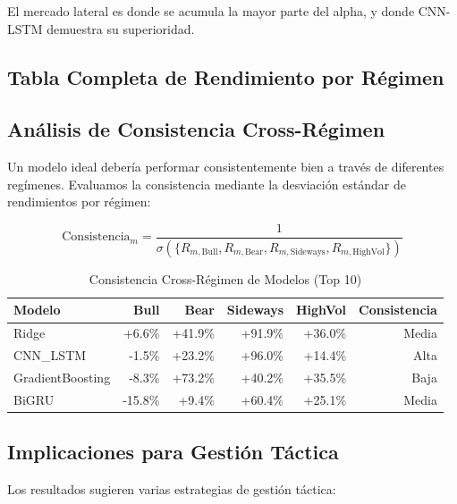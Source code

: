 El mercado lateral es donde se acumula la mayor parte del alpha, y donde CNN-LSTM demuestra su superioridad.

\subsection{Tabla Completa de Rendimiento por R\'egimen}
\label{subsec:regime_table}



\subsection{An\'alisis de Consistencia Cross-R\'egimen}
\label{subsec:cross_regime}

Un modelo ideal deber\'ia performar consistentemente bien a trav\'es de diferentes reg\'imenes. Evaluamos la consistencia mediante la desviaci\'on est\'andar de rendimientos por r\'egimen:

\begin{equation}
\text{Consistencia}_m = \frac{1}{\sigma(\{R_{m,\text{Bull}}, R_{m,\text{Bear}}, R_{m,\text{Sideways}}, R_{m,\text{HighVol}}\})}
\end{equation}

\begin{table}[htbp]
\centering
\caption{Consistencia Cross-R\'egimen de Modelos (Top 10)}
\label{tab:cross_regime_consistency}
\small
\begin{tabular}{@{}lrrrrr@{}}
\toprule
\textbf{Modelo} & \textbf{Bull} & \textbf{Bear} & \textbf{Sideways} & \textbf{HighVol} & \textbf{Consistencia} \\
\midrule
Ridge & +6.6\% & +41.9\% & +91.9\% & +36.0\% & Media \\
CNN\_LSTM & -1.5\% & +23.2\% & +96.0\% & +14.4\% & Alta \\
GradientBoosting & -8.3\% & +73.2\% & +40.2\% & +35.5\% & Baja \\
BiGRU & -15.8\% & +9.4\% & +60.4\% & +25.1\% & Media \\
\bottomrule
\end{tabular}
\end{table}

\subsection{Implicaciones para Gesti\'on T\'actica}
\label{subsec:tactical_implications}

Los resultados sugieren varias estrategias de gesti\'on t\'actica:

